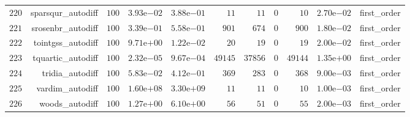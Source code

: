 \documentclass[varwidth=20cm,crop=true]{standalone}
\begin{document}
\begin{longtable}{rrrrrrrrrrr}
  \(   220\) & sparsqur\_autodiff & \(   100\) & \( 3.93\)e\(-02\) & \( 3.88\)e\(-01\) & \(    11\) & \(    11\) & \(     0\) & \(    10\) & \( 2.70\)e\(-02\) & first\_order \\
  \(   221\) & srosenbr\_autodiff & \(   100\) & \( 3.39\)e\(-01\) & \( 5.58\)e\(-01\) & \(   901\) & \(   674\) & \(     0\) & \(   900\) & \( 1.80\)e\(-02\) & first\_order \\
  \(   222\) & tointgss\_autodiff & \(   100\) & \( 9.71\)e\(+00\) & \( 1.22\)e\(-02\) & \(    20\) & \(    19\) & \(     0\) & \(    19\) & \( 2.00\)e\(-02\) & first\_order \\
  \(   223\) & tquartic\_autodiff & \(   100\) & \( 2.32\)e\(-05\) & \( 9.67\)e\(-04\) & \( 49145\) & \( 37856\) & \(     0\) & \( 49144\) & \( 1.35\)e\(+00\) & first\_order \\
  \(   224\) & tridia\_autodiff & \(   100\) & \( 5.83\)e\(-02\) & \( 4.12\)e\(-01\) & \(   369\) & \(   283\) & \(     0\) & \(   368\) & \( 9.00\)e\(-03\) & first\_order \\
  \(   225\) & vardim\_autodiff & \(   100\) & \( 1.60\)e\(+08\) & \( 3.30\)e\(+09\) & \(    11\) & \(    11\) & \(     0\) & \(    10\) & \( 1.00\)e\(-03\) & first\_order \\
  \(   226\) & woods\_autodiff & \(   100\) & \( 1.27\)e\(+00\) & \( 6.10\)e\(+00\) & \(    56\) & \(    51\) & \(     0\) & \(    55\) & \( 2.00\)e\(-03\) & first\_order \\\hline
\end{longtable}
\end{document}
